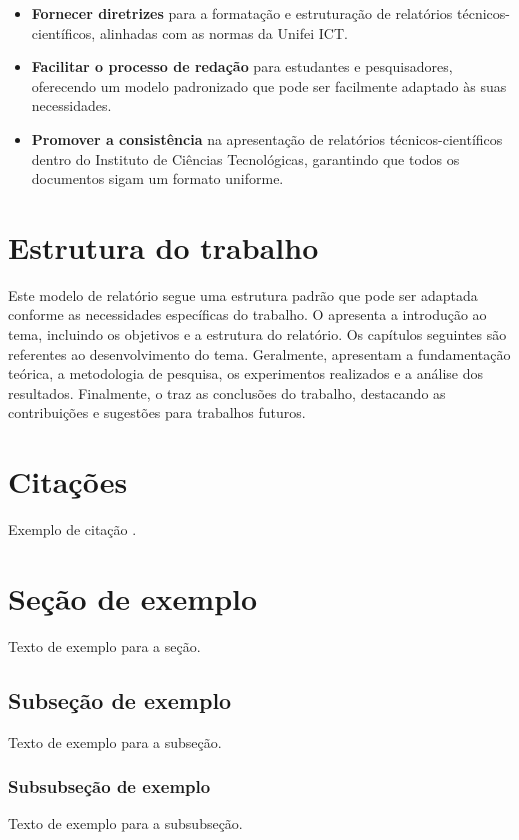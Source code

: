 \begin{itemize}
    \item \textbf{Fornecer diretrizes} para a formatação e estruturação de relatórios técnicos-científicos, alinhadas com as normas da Unifei ICT.
    \item \textbf{Facilitar o processo de redação} para estudantes e pesquisadores, oferecendo um modelo padronizado que pode ser facilmente adaptado às suas necessidades.
    \item \textbf{Promover a consistência} na apresentação de relatórios técnicos-científicos dentro do Instituto de Ciências Tecnológicas, garantindo que todos os documentos sigam um formato uniforme.
\end{itemize}

\section{Estrutura do trabalho}\label{sec:estrutura}

Este modelo de relatório segue uma estrutura padrão que pode ser adaptada conforme as necessidades específicas do trabalho. O  apresenta a introdução ao tema, incluindo os objetivos e a estrutura do relatório. Os capítulos seguintes são referentes ao desenvolvimento do tema. Geralmente, apresentam a fundamentação teórica, a metodologia de pesquisa, os experimentos realizados e a análise dos resultados. Finalmente, o  traz as conclusões do trabalho, destacando as contribuições e sugestões para trabalhos futuros.


\section{Citações}
Exemplo de citação \cite{fernandes2019}.

\section{Seção de exemplo}
Texto de exemplo para a seção.

\subsection{Subseção de exemplo}
Texto de exemplo para a subseção.

\subsubsection{Subsubseção de exemplo}
Texto de exemplo para a subsubseção.

